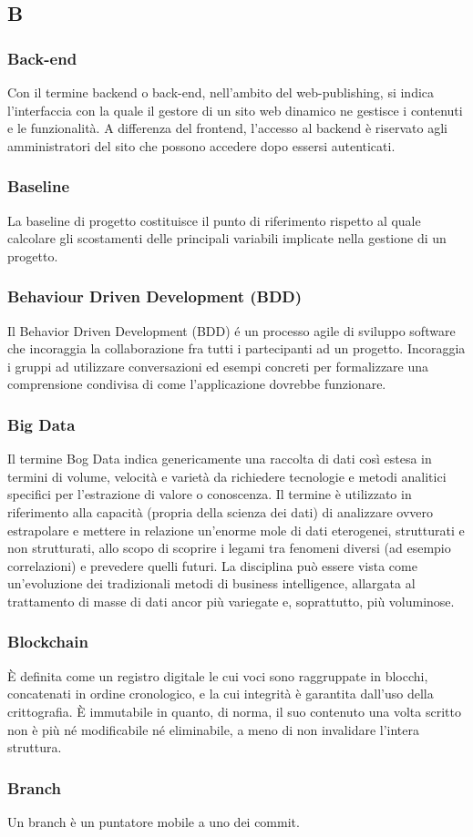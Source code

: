\subsection*{\textbf{\hfill \Huge{B} \hfill}} 
\subsubsection*{Back-end}
Con il termine backend o back-end, nell'ambito del web-publishing, si indica l'interfaccia con la quale il gestore di un sito web dinamico ne gestisce i contenuti e le funzionalità. A differenza del frontend, l'accesso al backend è riservato agli amministratori del sito che possono accedere dopo essersi autenticati.
\subsubsection*{Baseline}
La baseline di progetto costituisce il punto di riferimento rispetto al quale calcolare gli scostamenti delle principali variabili implicate nella gestione di un progetto.
\subsubsection*{Behaviour Driven Development (BDD)}
Il Behavior Driven Development (BDD) é un processo agile di sviluppo software che incoraggia la collaborazione fra tutti i partecipanti ad un progetto. Incoraggia i gruppi ad utilizzare conversazioni ed esempi concreti per formalizzare una comprensione condivisa di come l'applicazione dovrebbe funzionare.
\subsubsection*{Big Data}
Il termine Bog Data indica genericamente una raccolta di dati così estesa in termini di volume, velocità e varietà da richiedere tecnologie e metodi analitici specifici per l'estrazione di valore o conoscenza. Il termine è utilizzato in riferimento alla capacità (propria della scienza dei dati) di analizzare ovvero estrapolare e mettere in relazione un'enorme mole di dati eterogenei, strutturati e non strutturati, allo scopo di scoprire i legami tra fenomeni diversi (ad esempio correlazioni) e prevedere quelli futuri. La disciplina può essere vista come un'evoluzione dei tradizionali metodi di business intelligence, allargata al trattamento di masse di dati ancor più variegate e, soprattutto, più voluminose.
\subsubsection*{Blockchain}
È definita come un registro digitale le cui voci sono raggruppate in blocchi, concatenati in ordine cronologico, e la cui integrità è garantita dall’uso della crittografia. È immutabile in quanto, di norma, il suo contenuto una volta scritto non è più né modificabile né eliminabile, a meno di non invalidare l’intera struttura.
\subsubsection*{Branch}
Un branch è un puntatore mobile a uno dei commit.
